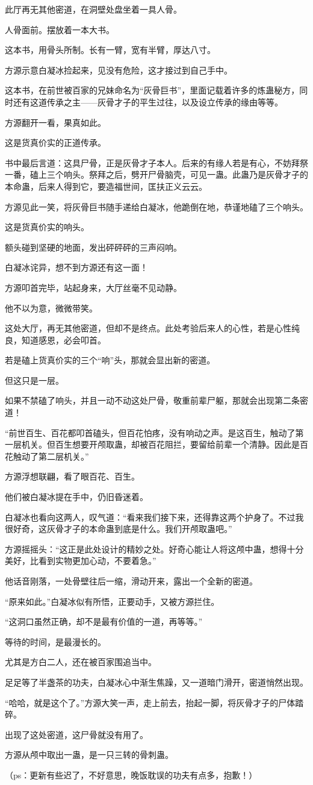 \begin{this_body}
此厅再无其他密道，在洞壁处盘坐着一具人骨。

人骨面前。摆放着一本大书。

这本书，用骨头所制。长有一臂，宽有半臂，厚达八寸。

方源示意白凝冰捡起来，见没有危险，这才接过到自己手中。

这本书，在前世被百家的兄妹命名为“灰骨巨书”，里面记载着许多的炼蛊秘方，同时还有这道传承之主——灰骨才子的平生过往，以及设立传承的缘由等等。

方源翻开一看，果真如此。

这是货真价实的正道传承。

书中最后言道：这具尸骨，正是灰骨才子本人。后来的有缘人若是有心，不妨拜祭一番，磕上三个响头。祭拜之后，劈开尸骨脑壳，可见一蛊。此蛊乃是灰骨才子的本命蛊，后来人得到它，要造福世间，匡扶正义云云。

方源见此一笑，将灰骨巨书随手递给白凝冰，他跪倒在地，恭谨地磕了三个响头。

这是货真价实的响头。

额头碰到坚硬的地面，发出砰砰砰的三声闷响。

白凝冰诧异，想不到方源还有这一面！

方源叩首完毕，站起身来，大厅丝毫不见动静。

他不以为意，微微带笑。

这处大厅，再无其他密道，但却不是终点。此处考验后来人的心性，若是心性纯良，知道感恩，必会叩首。

若是磕上货真价实的三个“响”头，那就会显出新的密道。

但这只是一层。

如果不禁磕了响头，并且一动不动这处尸骨，敬重前辈尸躯，那就会出现第二条密道！

“前世百生、百花都叩首磕头，但百花怕疼，没有响动之声。是这百生，触动了第一层机关。但百生想要开颅取蛊，却被百花阻拦，要留给前辈一个清静。因此是百花触动了第二层机关。”

方源浮想联翩，看了眼百花、百生。

他们被白凝冰提在手中，仍旧昏迷着。

白凝冰也看向这两人，叹气道：“看来我们接下来，还得靠这两个护身了。不过我很好奇，这灰骨才子的本命蛊到底是什么。我们开颅取蛊吧。”

方源摇摇头：“这正是此处设计的精妙之处。好奇心能让人将这颅中蛊，想得十分美好，比看到实物更加心动，不要着急。”

他话音刚落，一处骨壁往后一缩，滑动开来，露出一个全新的密道。

“原来如此。”白凝冰似有所悟，正要动手，又被方源拦住。

“这洞口虽然正确，却不是最有价值的一道，再等等。”

等待的时间，是最漫长的。

尤其是方白二人，还在被百家围追当中。

足足等了半盏茶的功夫，白凝冰心中渐生焦躁，又一道暗门滑开，密道悄然出现。

“哈哈，就是这个了。”方源大笑一声，走上前去，抬起一脚，将灰骨才子的尸体踏碎。

出现了这处密道，这尸骨就没有用了。

方源从颅中取出一蛊，是一只三转的骨刺蛊。

（ps：更新有些迟了，不好意思，晚饭耽误的功夫有点多，抱歉！）

\end{this_body}

